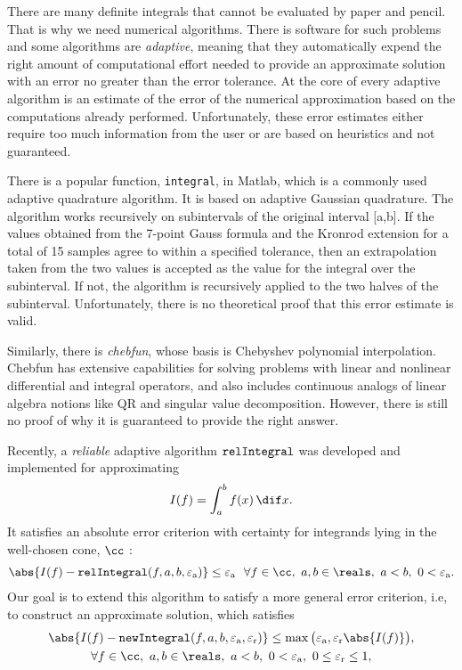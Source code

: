 \documentclass{iitthesis}
\DeclareMathOperator{\relinteg}{\texttt{\textup{relIntegral}}}
\DeclareMathOperator{\newinteg}{\texttt{\textup{newIntegral}}}
\newcommand{\abstol}{\varepsilon_{\textrm{a}}}
\newcommand{\reltol}{\varepsilon_{\textrm{r}}}
\begin{document}
There are many definite integrals that cannot be evaluated by paper and pencil. That is why we need numerical algorithms. There is software for such problems and some algorithms are \emph{adaptive}, meaning that they automatically expend the right amount of computational effort needed to provide an approximate solution with an error no greater than the error tolerance. At the core of every adaptive algorithm is an estimate of the error of the numerical approximation based on the computations already performed.  Unfortunately, these error estimates either require too much information from the user or are based on heuristics and not guaranteed. 

There is a popular function, \texttt{integral}, in Matlab\cite{matlab}, which is a commonly used adaptive quadrature algorithm. It is based on adaptive Gaussian quadrature. The algorithm works recursively on subintervals of the original interval [a,b]. If the values obtained from the 7-point Gauss formula and the Kronrod extension for a total of 15 samples agree to within a specified tolerance, then an extrapolation taken from the two values is accepted as the value for the integral over the subinterval. If not, the algorithm is recursively applied to the two halves of the subinterval. Unfortunately, there is no theoretical proof that this error estimate is valid.

Similarly, there is \emph{chebfun}, whose basis is Chebyshev polynomial interpolation. Chebfun has extensive capabilities for solving problems with linear and nonlinear differential and integral operators, and also includes continuous analogs of linear algebra notions like QR and singular value decomposition. However, there is still no proof of why it is guaranteed to provide the right answer.


Recently, a \emph{reliable} adaptive algorithm $\relinteg$ was developed and implemented for approximating
\begin{align*}
I(f) = \int_a^b f(x) \, \dif x.
\end{align*} It satisfies an absolute error criterion with certainty for integrands lying in the well-chosen cone, $\cc$ : 
\begin{align}
\abs{I(f) - \relinteg(f,a,b,\abstol)} \le \abstol  \  \   \forall f \in \cc,\ a, b \in \reals, \ a < b, \ 0 < \abstol. 
\end{align} 
Our goal is to extend this algorithm to satisfy a more general error criterion, i.e, to construct an approximate solution, which satisfies
\begin{multline}\label{tol}
\abs{I(f) - \newinteg(f,a,b,\abstol,\reltol)} \le \max \big( \abstol,\reltol \abs{I(f)} \big), \\ 
 \forall f \in \cc,\ a, b \in \reals, \ a < b, \ 0 < \abstol,\ 0 \le \reltol \le 1, 
\end{multline}
\end{document}
